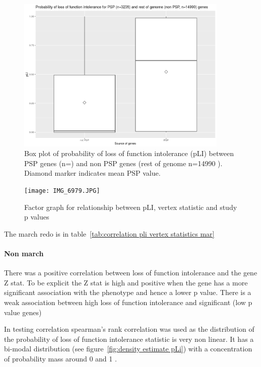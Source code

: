 \begin{figure}
    \centering
    \includegraphics[width=0.9\textwidth]{images/Rplot03_boxplot_pLI_PSP_non_PSP.png}
    \caption{Box plot of probability of loss of function intolerance (pLI) between PSP genes (n=) and non PSP genes (rest of genome n=14990 ). Diamond marker indicates mean PSP value. }
    \label{fig:Boxplot of pli}
\end{figure}

\begin{figure}
    \centering
    \texttt{[image: IMG\_6979.JPG]}
    \caption{Factor graph for relationship between pLI, vertex statistic and study p values}
    \label{Figure:Factor graph for relationship between pLI, vertex statistic and study p values}
\end{figure}

 
 The march redo is in table~\ref{tab:correlation pli vertex statistics mar}
 
  

\paragraph{Non march}
There was a positive correlation between loss of function intolerance and the gene Z stat. To be explicit the Z stat is high and positive when the gene has a more significant association with the phenotype and hence a lower p value. There is a weak association between high loss of function intolerance and significant (low p value genes)

 In testing correlation spearman’s rank correlation was used as the distribution of the probability of loss of function intolerance statistic is very non linear. It has a bi-modal distribution (see figure~\ref{fig:density estimate pLi}) with a concentration of probability mass around 0 and 1 .


